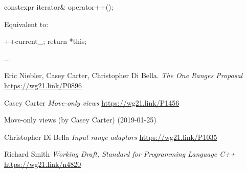 \documentclass{wg21}
\begin{document}
\begin{itemdecl}
	constexpr iterator& operator++();
\end{itemdecl}

\begin{itemdescr}
	\pnum
	\effects Equivalent to:
	\begin{codeblock}
		++current_;
		return *this;
	\end{codeblock}
\end{itemdescr}

...


\begin{thebibliography}{9}


	Eric Niebler, Casey Carter, Christopher Di Bella.
	\emph{The One Ranges Proposal}\newline
	\url{https://wg21.link/P0896}


	Casey Carter
	\emph{ Move-only views}\newline
	\url{https://wg21.link/P1456}

	 Move-only views (by Casey Carter) (2019-01-25)

	Christopher Di Bella
	\emph{Input range adaptors}\newline
	\url{https://wg21.link/P1035}

	Richard Smith
	\emph{Working Draft, Standard for Programming Language C++}\newline
	\url{https://wg21.link/n4820}


\end{thebibliography}
\end{document}
